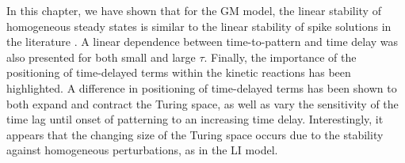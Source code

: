 In this chapter, we have shown that for the GM model, the linear stability of homogeneous steady states is similar to the linear stability of spike solutions in the literature \cite{fadai1,fadai2}. A linear dependence between time-to-pattern and time delay was also presented for both small and large $\tau$. Finally, the importance of the positioning of time-delayed terms within the kinetic reactions has been highlighted. A difference in positioning of time-delayed terms has been shown to both expand and contract the Turing space, as well as vary the sensitivity of the time lag until onset of patterning to an increasing time delay. Interestingly, it appears that the changing size of the Turing space occurs due to the stability against homogeneous perturbations, as in the LI model.
